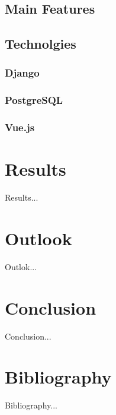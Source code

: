\documentclass[a4paper, 12pt, headsepline]{scrartcl}
\begin{document}
\subsection{Main Features}

\subsection{Technolgies}


\subsubsection{Django}


\subsubsection{PostgreSQL}


\subsubsection{Vue.js}



\section{Results}
Results...

\section{Outlook}
Outlok...

\section{Conclusion}
Conclusion...

\section{Bibliography}
Bibliography...
\end{document}
